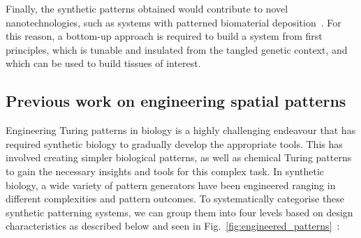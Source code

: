 Finally, the synthetic patterns obtained would contribute to novel nanotechnologies, such as systems with patterned biomaterial deposition~\parencite{Din2020, Cao2017}.
For this reason, a bottom-up approach is required to build a system from first principles, which is tunable and insulated from the tangled genetic context, and which can be used to build tissues of interest.



\subsection{Previous work on engineering spatial patterns}

Engineering Turing patterns in biology is a highly challenging endeavour that has required synthetic biology to gradually develop the appropriate tools.
This has involved creating simpler biological patterns, as well as chemical Turing patterns to gain the necessary insights and tools for this complex task.
In synthetic biology, a wide variety of pattern generators have been engineered ranging in different complexities and pattern outcomes.
To systematically categorise these synthetic patterning systems, we can group them into four levels based on design characteristics as described below and seen in Fig.~\ref{fig:engineered_patterns}~\parencite{huidobro}:


